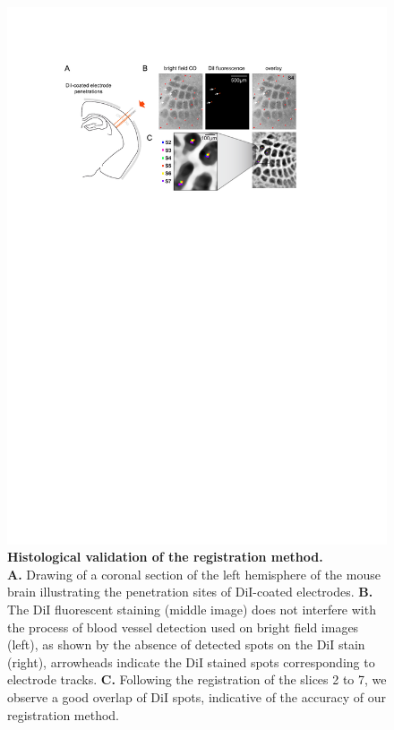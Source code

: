 \begin{figure}[!ht]
\centering
\includegraphics[width=140mm]{images/Perronnet-Figure4}
\caption{
	\textbf{Histological validation of the registration method.} \\
	\textbf{A.} Drawing of a coronal section of the left hemisphere of the mouse brain illustrating the penetration sites of DiI-coated electrodes. 
	\textbf{B.} The DiI fluorescent staining (middle image) does not interfere with the process of blood vessel detection used on bright field images (left), as shown by the absence of detected spots on the DiI stain (right), arrowheads indicate the DiI stained spots corresponding to electrode tracks. 
	\textbf{C.} Following the registration of the slices 2 to 7, we observe a good overlap of DiI spots, indicative of the accuracy of our registration method.
}
\label{fig-histo-validation}  
\end{figure}


